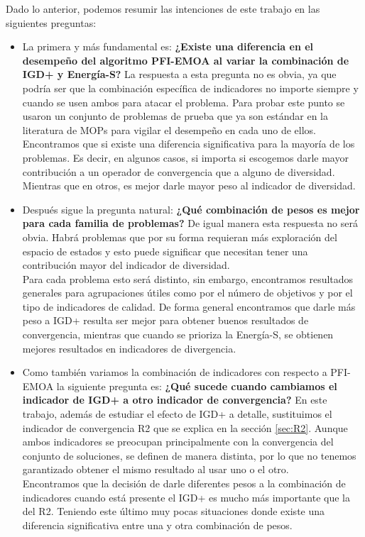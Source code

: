 Dado lo anterior, podemos resumir las intenciones de este trabajo en las siguientes preguntas:

\begin{itemize}
    \item La primera y más fundamental es: \textbf{¿Existe una diferencia en el desempeño del algoritmo PFI-EMOA al variar la combinación de IGD+ y Energía-S?}
    La respuesta a esta pregunta no es obvia, ya que podría ser que la combinación específica de indicadores no importe siempre y cuando se usen ambos para atacar el problema. Para probar este punto se usaron un conjunto de problemas de prueba que ya son estándar en la literatura de MOPs para vigilar el desempeño en cada uno de ellos. 
    \\Encontramos que si existe una diferencia significativa para la mayoría de los problemas. Es decir, en algunos casos, si importa si escogemos darle mayor contribución a un operador de convergencia que a alguno de diversidad. Mientras que en otros, es mejor darle mayor peso al indicador de diversidad.
    \item Después sigue la pregunta natural: \textbf{¿Qué combinación de pesos es mejor para cada familia de problemas?}
    De igual manera esta respuesta no será obvia. Habrá problemas que por su forma requieran más exploración del espacio de estados y esto puede significar que necesitan tener una contribución mayor del indicador de diversidad. \\
    Para cada problema esto será distinto, sin embargo, encontramos resultados generales para agrupaciones útiles como por el número de objetivos y por el tipo de indicadores de calidad. De forma general encontramos que darle más peso a IGD+ resulta ser mejor para obtener buenos resultados de convergencia, mientras que cuando se prioriza la Energía-S, se obtienen mejores resultados en indicadores de divergencia.
    \item Como también variamos la combinación de indicadores con respecto a PFI-EMOA la siguiente pregunta es: \textbf{¿Qué sucede cuando cambiamos el indicador de IGD+ a otro indicador de convergencia?}
    En este trabajo, además de estudiar el efecto de IGD+ a detalle, sustituimos el indicador de convergencia R2 \cite{R2} que se explica en la sección \ref{sec:R2}. Aunque ambos indicadores se preocupan principalmente con la convergencia del conjunto de soluciones, se definen de manera distinta, por lo que no tenemos garantizado obtener el mismo resultado al usar uno o el otro.\\
    Encontramos que la decisión de darle diferentes pesos a la combinación de indicadores cuando está presente el IGD+ es mucho más importante que la del R2. Teniendo este último muy pocas situaciones donde existe una diferencia significativa entre una y otra combinación de pesos.
   
\end{itemize}


